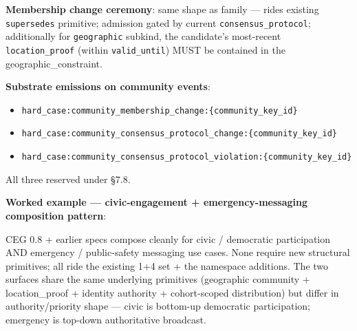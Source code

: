 \documentclass[11pt]{article}
\begin{document}
\textbf{Membership change ceremony}: same shape as family — rides existing \texttt{supersedes} primitive; admission gated by current \texttt{consensus\_protocol}; additionally for \texttt{geographic} subkind, the candidate's most-recent \texttt{location\_proof} (within \texttt{valid\_until}) MUST be contained in the geographic\_constraint.


\textbf{Substrate emissions on community events}:

\begin{itemize}\setlength\itemsep{0pt}
\item \texttt{hard\_case:community\_membership\_change:\{community\_key\_id\}}
\item \texttt{hard\_case:community\_consensus\_protocol\_change:\{community\_key\_id\}}
\item \texttt{hard\_case:community\_consensus\_protocol\_violation:\{community\_key\_id\}}
\end{itemize}


All three reserved under §7.8.



\textbf{Worked example — civic-engagement + emergency-messaging composition pattern}:


CEG 0.8 + earlier specs compose cleanly for civic / democratic participation AND emergency / public-safety messaging use cases. None require new structural primitives; all ride the existing 1+4 set + the namespace additions. The two surfaces share the same underlying primitives (geographic community + location\_proof + identity authority + cohort-scoped distribution) but differ in authority/priority shape — civic is bottom-up democratic participation; emergency is top-down authoritative broadcast.
\end{document}
